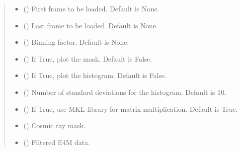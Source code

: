 \documentclass[letterpaper,10pt,english]{sphinxmanual}
\begin{document}
\begin{fulllineitems}
\begin{quote}
\begin{description}
\begin{itemize}
\item {} 
\sphinxAtStartPar
{} () \textendash{} First frame to be loaded. Default is None.

\item {} 
\sphinxAtStartPar
{} () \textendash{} Last frame to be loaded. Default is None.

\item {} 
\sphinxAtStartPar
{} () \textendash{} Binning factor. Default is None.

\item {} 
\sphinxAtStartPar
{} () \textendash{} If True, plot the mask. Default is False.

\item {} 
\sphinxAtStartPar
{} () \textendash{} If True, plot the histogram. Default is False.

\item {} 
\sphinxAtStartPar
{} () \textendash{} Number of standard deviations for the histogram. Default is 10.

\item {} 
\sphinxAtStartPar
{} () \textendash{} If True, use MKL library for matrix multiplication. Default is True.

\end{itemize}

\sphinxAtStartPar
\begin{itemize}
\item {} 
\sphinxAtStartPar
{} () \textendash{} Cosmic ray mask.

\item {} 
\sphinxAtStartPar
{} () \textendash{} Filtered E4M data.

\end{itemize}


\end{description}\end{quote}

\end{fulllineitems}
\end{document}
